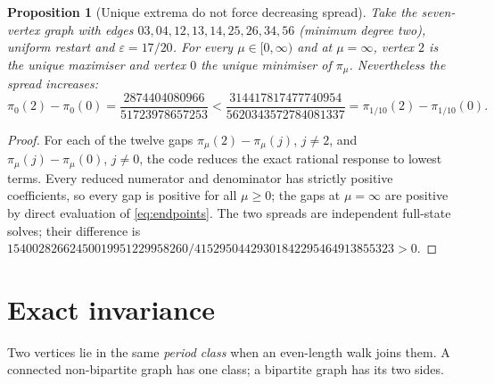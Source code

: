 \documentclass[11pt,a4paper]{article}
\newtheorem{proposition}[theorem]{Proposition}
\theoremstyle{definition}\newtheorem{conjecture}{Conjecture}
\theoremstyle{remark}\newtheorem{remark}[theorem]{Remark}
\newcommand{\eps}{\varepsilon}
\begin{document}
\begin{proposition}[Unique extrema do not force decreasing spread]\label{prop:uniquespread}
Take the seven-vertex graph with edges $03,04,12,13,14,25,26,34,56$ (minimum degree two), uniform restart and $\eps=17/20$. For every $\mu\in[0,\infty)$ and at $\mu=\infty$, vertex $2$ is the unique maximiser and vertex $0$ the unique minimiser of $\pi_\mu$. Nevertheless the spread increases:
\[
 \pi_0(2)-\pi_0(0)=\frac{2874404080966}{51723978657253}
 <\frac{314417817477740954}{5620343572784081337}=\pi_{1/10}(2)-\pi_{1/10}(0).
\]
\end{proposition}
\begin{proof}
For each of the twelve gaps $\pi_\mu(2)-\pi_\mu(j)$, $j\neq2$, and $\pi_\mu(j)-\pi_\mu(0)$, $j\neq0$, the code reduces the exact rational response to lowest terms. Every reduced numerator and denominator has strictly positive coefficients, so every gap is positive for all $\mu\geq0$; the gaps at $\mu=\infty$ are positive by direct evaluation of \eqref{eq:endpoints}. The two spreads are independent full-state solves; their difference is $15400282662450019951229958260/41529504429301842295464913855323>0$.
\end{proof}


\section{Exact invariance}\label{sec:invariance}
Two vertices lie in the same \emph{period class} when an even-length walk joins them. A connected non-bipartite graph has one class; a bipartite graph has its two sides.
\end{document}
